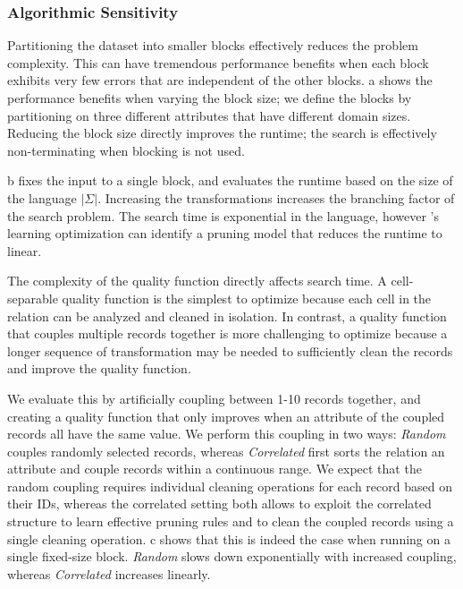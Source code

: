 \subsubsection{Algorithmic Sensitivity}

 Partitioning the dataset into smaller blocks effectively reduces the problem complexity.  This can have tremendous performance benefits when each block exhibits very few errors that are independent of the other blocks.  a shows the performance benefits when varying the block size; we define the blocks by partitioning on three different attributes that have different domain sizes.  Reducing the block size directly improves the runtime; the search is effectively non-terminating when blocking is not used.    

 b fixes the input to a single block, and evaluates the runtime based on the size of the language $|\Sigma|$.  Increasing the transformations increases the branching factor of the search problem. The search time is exponential in the language, however \sys's learning optimization can identify a pruning model that reduces the runtime to linear.

 The complexity of the quality function directly affects search time.  A cell-separable quality function is the simplest to optimize because each cell in the relation can be analyzed and cleaned in isolation.  In contrast, a quality function that couples multiple records together is more challenging to optimize because a longer sequence of transformation may be needed to sufficiently clean the records and improve the quality function.  

We evaluate this by artificially coupling between 1-10 records together, and creating a quality function that only improves when an attribute of the coupled records all have the same value.  We perform this coupling in two ways: {\it Random} couples randomly selected records, whereas {\it Correlated} first sorts the relation an attribute and couple records within a continuous range.  We expect that the random coupling requires individual cleaning operations for each record based on their IDs, whereas the correlated setting both allows \sys to exploit the correlated structure to learn effective pruning rules and to clean the coupled records using a single cleaning operation.  c shows that this is indeed the case when running \sys on a single fixed-size block. {\it Random} slows down exponentially with increased coupling, whereas {\it Correlated} increases linearly.

